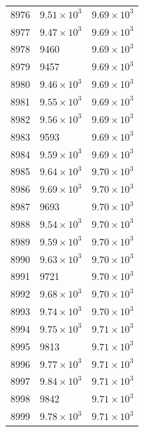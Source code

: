 \begin{table}[H]
\begin{tabular}{lll}
8976 & $\displaystyle 9.51 \times 10^{3}$ & $\displaystyle 9.69 \times 10^{3}$ \\
8977 & $\displaystyle 9.47 \times 10^{3}$ & $\displaystyle 9.69 \times 10^{3}$ \\
8978 & 9460 & $\displaystyle 9.69 \times 10^{3}$ \\
8979 & 9457 & $\displaystyle 9.69 \times 10^{3}$ \\
8980 & $\displaystyle 9.46 \times 10^{3}$ & $\displaystyle 9.69 \times 10^{3}$ \\
8981 & $\displaystyle 9.55 \times 10^{3}$ & $\displaystyle 9.69 \times 10^{3}$ \\
8982 & $\displaystyle 9.56 \times 10^{3}$ & $\displaystyle 9.69 \times 10^{3}$ \\
8983 & 9593 & $\displaystyle 9.69 \times 10^{3}$ \\
8984 & $\displaystyle 9.59 \times 10^{3}$ & $\displaystyle 9.69 \times 10^{3}$ \\
8985 & $\displaystyle 9.64 \times 10^{3}$ & $\displaystyle 9.70 \times 10^{3}$ \\
8986 & $\displaystyle 9.69 \times 10^{3}$ & $\displaystyle 9.70 \times 10^{3}$ \\
8987 & 9693 & $\displaystyle 9.70 \times 10^{3}$ \\
8988 & $\displaystyle 9.54 \times 10^{3}$ & $\displaystyle 9.70 \times 10^{3}$ \\
8989 & $\displaystyle 9.59 \times 10^{3}$ & $\displaystyle 9.70 \times 10^{3}$ \\
8990 & $\displaystyle 9.63 \times 10^{3}$ & $\displaystyle 9.70 \times 10^{3}$ \\
8991 & 9721 & $\displaystyle 9.70 \times 10^{3}$ \\
8992 & $\displaystyle 9.68 \times 10^{3}$ & $\displaystyle 9.70 \times 10^{3}$ \\
8993 & $\displaystyle 9.74 \times 10^{3}$ & $\displaystyle 9.70 \times 10^{3}$ \\
8994 & $\displaystyle 9.75 \times 10^{3}$ & $\displaystyle 9.71 \times 10^{3}$ \\
8995 & 9813 & $\displaystyle 9.71 \times 10^{3}$ \\
8996 & $\displaystyle 9.77 \times 10^{3}$ & $\displaystyle 9.71 \times 10^{3}$ \\
8997 & $\displaystyle 9.84 \times 10^{3}$ & $\displaystyle 9.71 \times 10^{3}$ \\
8998 & 9842 & $\displaystyle 9.71 \times 10^{3}$ \\
8999 & $\displaystyle 9.78 \times 10^{3}$ & $\displaystyle 9.71 \times 10^{3}$ \\

\end{tabular}
\end{table}
